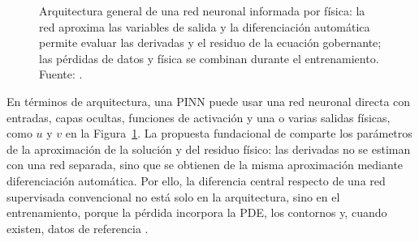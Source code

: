 \documentclass[11pt,a4paper,oneside]{report}
\begin{document}
\begin{figure}[H]
{%
}
\caption[Arquitectura general de una red neuronal informada por física]{Arquitectura general de una red neuronal informada por física: la red aproxima las variables de salida y la diferenciación automática permite evaluar las derivadas y el residuo de la ecuación gobernante; las pérdidas de datos y física se combinan durante el entrenamiento. Fuente: \textcite[fig.~1]{lawal2022}.}
\label{fig:arquitectura-pinn-lawal}
\end{figure}

En términos de arquitectura, una PINN puede usar una red neuronal directa con entradas, capas ocultas, funciones de activación y una o varias salidas físicas, como $u$ y $v$ en la Figura~\ref{fig:arquitectura-pinn-lawal}. La propuesta fundacional de \textcite[686--690]{raissi2019} comparte los parámetros de la aproximación de la solución y del residuo físico: las derivadas no se estiman con una red separada, sino que se obtienen de la misma aproximación mediante diferenciación automática. Por ello, la diferencia central respecto de una red supervisada convencional no está solo en la arquitectura, sino en el entrenamiento, porque la pérdida incorpora la PDE, los contornos y, cuando existen, datos de referencia \parencites[686--690]{raissi2019}[1--2,14--17]{lawal2022}.
\end{document}
